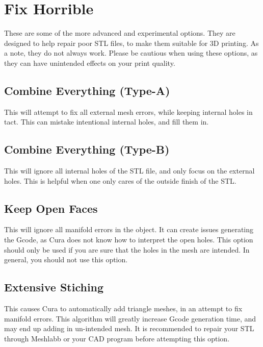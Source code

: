 \section{Fix Horrible}

These are some of the more advanced and experimental options. They are designed to help repair poor STL files, to make them suitable for 3D printing. As a note, they do not always work. Please be cautious when using these options, as they can have unintended effects on your print quality.

\subsection{Combine Everything (Type-A)}

This will attempt to fix all external mesh errors, while keeping internal holes in tact. This can mistake intentional internal holes, and fill them in.

\subsection{Combine Everything (Type-B)}

This will ignore all internal holes of the STL file, and only focus on the external holes. This is helpful when one only cares of the outside finish of the STL.

\subsection{Keep Open Faces}

This will ignore all manifold errors in the object. It can create issues generating the Gcode, as Cura does not know how to interpret the open holes. This option should only be used if you are sure that the holes in the mesh are intended. In general, you should not use this option.

\subsection{Extensive Stiching}

This causes Cura to automatically add triangle meshes, in an attempt to fix manifold errors. This algorithm will greatly increase Gcode generation time, and may end up adding in un-intended mesh. It is recommended to repair your STL through Meshlabb or your CAD program before attempting this option.
